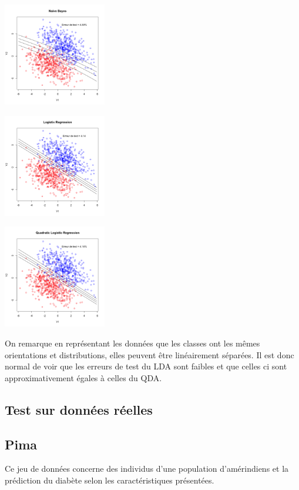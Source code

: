 \documentclass[10pt]{article}
\begin{document}
\begin{center}
	\includegraphics[width=45mm]{Figures/synth3_nb.png}
\end{center}
\begin{minipage}{.5\textwidth}
	\includegraphics[width=45mm]{Figures/synth3_logreg.png}
\end{minipage}%
\hspace{0.02\linewidth}
\begin{minipage}{.5\textwidth}
	\includegraphics[width=45mm]{Figures/synth3_logregquad.png}
\end{minipage}

On remarque en représentant les données que les classes ont les mêmes orientations et distributions, elles peuvent être linéairement séparées.  Il est donc normal de voir que les erreurs de test du LDA sont faibles et que celles ci sont approximativement égales à celles du QDA. 


\subsection{Test sur données réelles}
\subsection{Pima}
Ce jeu de données concerne des individus d'une population d’amérindiens et la prédiction du diabète selon les caractéristiques présentées. 
\end{document}
